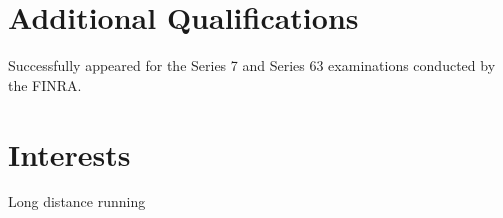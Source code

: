 \documentclass[margin,line]{resume}
\begin{document}
\begin{resume}
       \section{\mysidestyle Additional Qualifications}
       \begin{list2}
	\item Successfully appeared for the Series 7 and Series 63 examinations conducted by the FINRA.
	\end{list2}

       \section{\mysidestyle Interests}
       \begin{list2}
	\item Long distance running
	\end{list2}
	
\end{resume}
\end{document}
